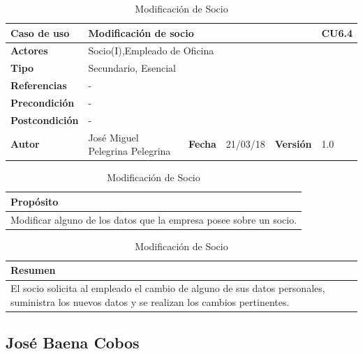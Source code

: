 \documentclass[12pt,spanish]{article}
\begin{document}
\begin{table}[H]
\centering
\begin{tabular}{|m{3cm}|m{4cm}|m{2cm}|m{2cm}|m{2cm}|m{1cm}|}
\hline
\textbf{Caso de uso} &  \multicolumn{4}{m{8cm}|}{Modificación de socio} \vline &  \cellcolor{gray!40}CU6.4 \\
\hline
\textbf{Actores} & \multicolumn{5}{m{8cm}|}{Socio(I),Empleado de Oficina} \\
\hline
\textbf{Tipo} & \multicolumn{5}{m{8cm}|}{Secundario, Esencial} \\
\hline
\textbf{Referencias} &\multicolumn{5}{m{8cm}|}{-} \\
\hline
\textbf{Precondición} & \multicolumn{5}{m{8cm}|}{-} \\
\hline
\textbf{Postcondición} & \multicolumn{5}{m{8cm}|}{-} \\
\hline
\textbf{Autor} & José Miguel Pelegrina Pelegrina & \textbf{Fecha} & 21/03/18 & \textbf{Versión} & 1.0 \\
\hline
\end{tabular}

\vspace{1cm}

\begin{tabular}{|m{16.2cm}|}
\hline
\textbf{Propósito} \\
\hline
Modificar alguno de los datos que la empresa posee sobre un socio. \\
\hline
\end{tabular}

\vspace{1cm}

\begin{tabular}{|m{16.2cm}|}
\hline
\textbf{Resumen} \\
\hline
El socio solicita al empleado el cambio de alguno de sus datos personales, suministra los nuevos datos y se realizan los cambios pertinentes. \\
\hline
\end{tabular}

\caption{Modificación de Socio}
\end{table}



\subsection{José Baena Cobos}

\end{document}
